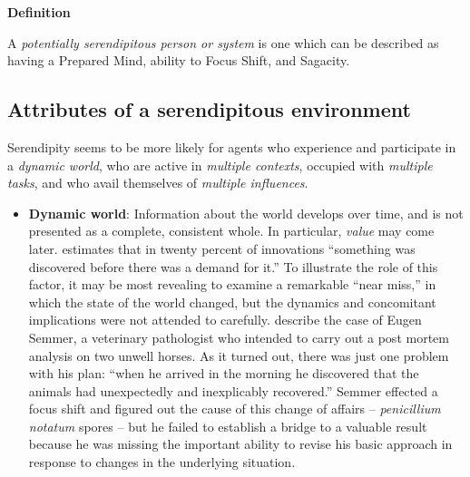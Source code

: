 \begin{mdframed}
{\bf Definition}

A {\em potentially serendipitous person or system} is one which can be described as having a Prepared Mind, ability to Focus Shift, and Sagacity.
\end{mdframed}


\subsection{Attributes of a serendipitous
  environment}\label{environment}
Serendipity seems to be more likely for agents who experience and
participate in a \emph{dynamic world}, who are active in
\emph{multiple contexts}, occupied with \emph{multiple tasks}, and who
avail themselves of \emph{multiple influences}.

\begin{itemize}
\item \textbf{Dynamic world}: Information about the world develops
  over time, and is not presented as a complete, consistent whole.  In
  particular, \emph{value} may come later.
   estimates that in twenty percent of
  innovations ``something was discovered before there was a demand for
  it.''  To illustrate the role of this factor, it may be most
  revealing to examine a remarkable ``near miss,'' in which the state
  of the world changed, but the dynamics and concomitant implications
  were not attended to carefully.
  \citet[pp.~75-76]{cropley2013creativity} describe the case of Eugen
  Semmer, a veterinary pathologist who intended to carry out a post
  mortem analysis on two unwell horses.  As it turned out, there was
  just one problem with his plan: ``when he arrived in the morning he
  discovered that the animals had unexpectedly and inexplicably
  recovered.''  %
Semmer effected a focus shift and figured out the cause of this change
of affairs -- \emph{penicillium notatum} spores -- but he failed to
establish a bridge to a valuable result because he was missing the
important ability \cite{bereiter1997situated} to revise his basic
approach in response to changes in the underlying situation.
\end{itemize}

